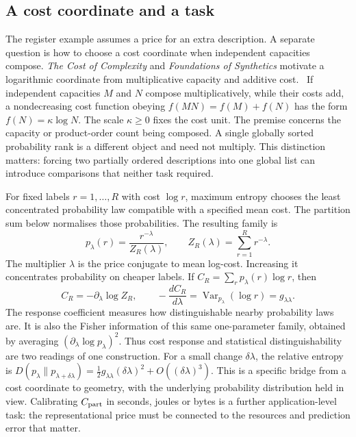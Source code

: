 \subsection{A cost coordinate and a task}\label{subsec:cost-task}
The register example assumes a price for an extra description. A separate question is how to choose a cost coordinate when independent capacities compose. \emph{The Cost of Complexity} and \emph{Foundations of Synthetics} motivate a logarithmic coordinate from multiplicative capacity and additive cost.~\cite{Reference975536} If independent capacities $M$ and $N$ compose multiplicatively, while their costs add, a nondecreasing cost function obeying $f(MN)=f(M)+f(N)$ has the form $f(N)=\kappa\log N$. The scale $\kappa\geq0$ fixes the cost unit. The premise concerns the capacity or product-order count being composed. A single globally sorted probability rank is a different object and need not multiply. This distinction matters: forcing two partially ordered descriptions into one global list can introduce comparisons that neither task required.

For fixed labels $r=1,\ldots,R$ with cost $\log r$, maximum entropy chooses the least concentrated probability law compatible with a specified mean cost. The partition sum below normalises those probabilities. The resulting family is
\begin{equation}
 p_\lambda(r)=\frac{r^{-\lambda}}{Z_R(\lambda)},\qquad
 Z_R(\lambda)=\sum_{r=1}^{R}r^{-\lambda}.
 \label{eq:cost-family}
\end{equation}
The multiplier $\lambda$ is the price conjugate to mean log-cost. Increasing it concentrates probability on cheaper labels. If $C_R=\sum_r p_\lambda(r)\log r$, then
\begin{equation}
 C_R=-\partial_\lambda\log Z_R,\qquad
 -\frac{dC_R}{d\lambda}
 =\operatorname{Var}_{p_\lambda}(\log r)
 =g_{\lambda\lambda}.
 \label{eq:cost-geometry}
\end{equation}
The response coefficient measures how distinguishable nearby probability laws are. It is also the Fisher information of this same one-parameter family, obtained by averaging $(\partial_\lambda\log p_\lambda)^2$. Thus cost response and statistical distinguishability are two readings of one construction. For a small change $\delta\lambda$, the relative entropy is
$D(p_\lambda\|p_{\lambda+\delta\lambda})
=\tfrac12g_{\lambda\lambda}(\delta\lambda)^2+O((\delta\lambda)^3)$.
This is a specific bridge from a cost coordinate to geometry, with the underlying probability distribution held in view. Calibrating $C_{\rm part}$ in seconds, joules or bytes is a further application-level task: the representational price must be connected to the resources and prediction error that matter.

